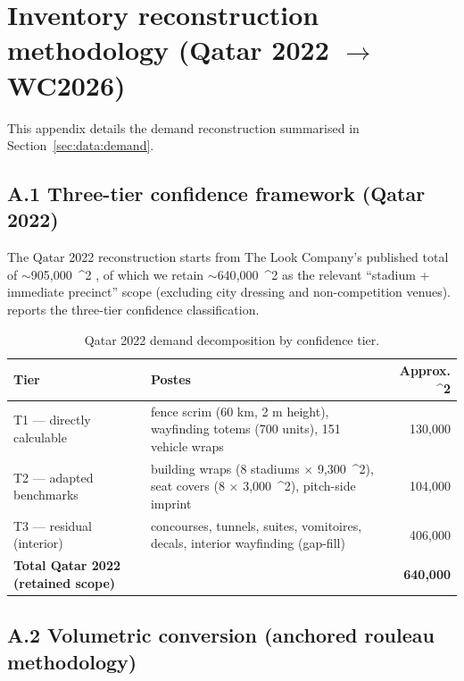 \documentclass[11pt,a4paper]{article}
\numberwithin{equation}{section}
\newcommand{\msq}{\text{m}^{2}}
\begin{document}
\section{Inventory reconstruction methodology (Qatar 2022 \texorpdfstring{$\to$}{->} WC2026)}\label{app:reconstruction}
\setcounter{figure}{0}
\setcounter{table}{0}

This appendix details the demand reconstruction summarised in Section~\ref{sec:data:demand}.

\subsection*{A.1 Three-tier confidence framework (Qatar 2022)}

The Qatar 2022 reconstruction starts from The Look Company's published total of $\sim$905{,}000~\msq{} \cite{thelookcompany_qatar}, of which we retain $\sim$640{,}000~\msq{} as the relevant ``stadium + immediate precinct'' scope (excluding city dressing and non-competition venues).  reports the three-tier confidence classification.

\begin{table}[h]
\centering
\small
\caption{Qatar 2022 demand decomposition by confidence tier.}
\label{tab:tiers}
\begin{tabularx}{\textwidth}{@{}l X r@{}}
\toprule
\textbf{Tier} & \textbf{Postes} & \textbf{Approx. \msq{}} \\
\midrule
T1 — directly calculable & fence scrim (60 km, 2 m height), wayfinding totems (700 units), 151 vehicle wraps & 130{,}000 \\
T2 — adapted benchmarks  & building wraps (8 stadiums $\times$ 9{,}300~\msq{}), seat covers (8 $\times$ 3{,}000~\msq{}), pitch-side imprint & 104{,}000 \\
T3 — residual (interior) & concourses, tunnels, suites, vomitoires, decals, interior wayfinding (gap-fill) & 406{,}000 \\
\midrule
\textbf{Total Qatar 2022 (retained scope)} & & \textbf{640{,}000} \\
\bottomrule
\end{tabularx}
\end{table}

\subsection*{A.2 Volumetric conversion (anchored rouleau methodology)}
\end{document}
